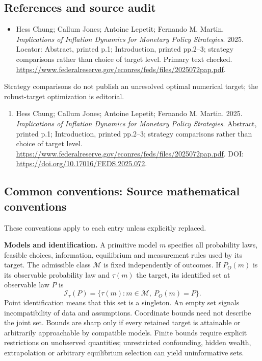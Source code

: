 \documentclass[11pt,a4paper]{article}
\begin{document}
\subsection*{References and source audit}
\begin{itemize}
\item Hess Chung; Callum Jones; Antoine Lepetit; Fernando M. Martin. \emph{Implications of Inflation Dynamics for Monetary Policy Strategies}. 2025. Locator: Abstract, printed p.1; Introduction, printed pp.2--3; strategy comparisons rather than choice of target level. Primary text checked. \url{https://www.federalreserve.gov/econres/feds/files/2025072pap.pdf}.
\end{itemize}
Strategy comparisons do not publish an unresolved optimal numerical target; the robust-target optimization is editorial.
\begin{enumerate}\raggedright
\item\hypertarget{definitions:source:30007528:1}{} Hess Chung; Callum Jones; Antoine Lepetit; Fernando M. Martin. 2025. \emph{Implications of Inflation Dynamics for Monetary Policy Strategies}. Abstract, printed p.1; Introduction, printed pp.2--3; strategy comparisons rather than choice of target level.
\url{https://www.federalreserve.gov/econres/feds/files/2025072pap.pdf}.
DOI: \url{https://doi.org/10.17016/FEDS.2025.072}.
\end{enumerate}

\subsection*{Common conventions: Source mathematical conventions}

These conventions apply to each entry unless explicitly replaced.

\textbf{Models and identification.} A primitive model \(m\) specifies all probability laws, feasible choices, information, equilibrium and measurement rules used by its target. The admissible class \(\mathcal M\) is fixed independently of outcomes. If \(P_O(m)\) is its observable probability law and \(\tau(m)\) the target, its identified set at observable law \(P\) is
\[
 \mathcal I_\tau(P)=\{\tau(m):m\in\mathcal M,\ P_O(m)=P\}.
\]
Point identification means that this set is a singleton. An empty set signals incompatibility of data and assumptions. Coordinate bounds need not describe the joint set. Bounds are sharp only if every retained target is attainable or arbitrarily approachable by compatible models. Finite bounds require explicit restrictions on unobserved quantities; unrestricted confounding, hidden wealth, extrapolation or arbitrary equilibrium selection can yield uninformative sets.
\end{document}
